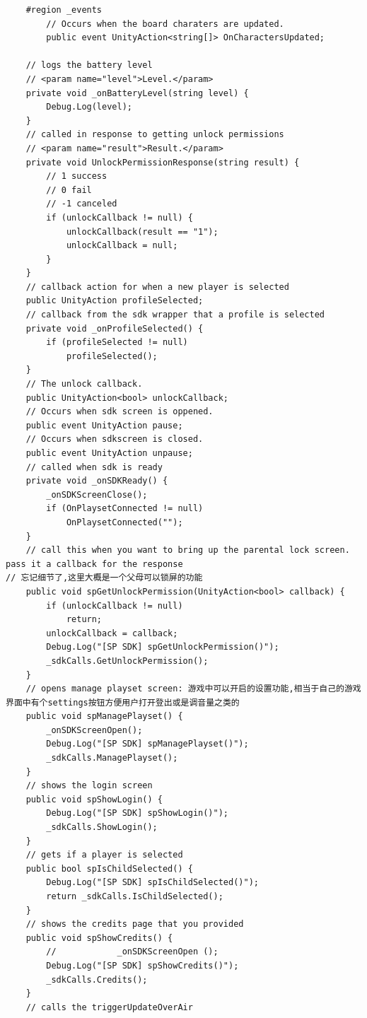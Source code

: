 \documentclass[9pt, b5paper]{article}
\begin{document}
\begin{verbatim}
    #region _events
        // Occurs when the board charaters are updated.
        public event UnityAction<string[]> OnCharactersUpdated;

    // logs the battery level
    // <param name="level">Level.</param>
    private void _onBatteryLevel(string level) {
        Debug.Log(level);
    }
    // called in response to getting unlock permissions
    // <param name="result">Result.</param>
    private void UnlockPermissionResponse(string result) {
        // 1 success
        // 0 fail
        // -1 canceled
        if (unlockCallback != null) {
            unlockCallback(result == "1");
            unlockCallback = null;
        }
    }
    // callback action for when a new player is selected
    public UnityAction profileSelected;
    // callback from the sdk wrapper that a profile is selected
    private void _onProfileSelected() {
        if (profileSelected != null)
            profileSelected();
    }
    // The unlock callback.
    public UnityAction<bool> unlockCallback;
    // Occurs when sdk screen is oppened.
    public event UnityAction pause;
    // Occurs when sdkscreen is closed.
    public event UnityAction unpause;
    // called when sdk is ready
    private void _onSDKReady() {
        _onSDKScreenClose();
        if (OnPlaysetConnected != null)
            OnPlaysetConnected("");
    }
    // call this when you want to bring up the parental lock screen. pass it a callback for the response
// 忘记细节了,这里大概是一个父母可以锁屏的功能      
    public void spGetUnlockPermission(UnityAction<bool> callback) {
        if (unlockCallback != null)
            return;
        unlockCallback = callback;
        Debug.Log("[SP SDK] spGetUnlockPermission()");
        _sdkCalls.GetUnlockPermission();
    }
    // opens manage playset screen: 游戏中可以开启的设置功能,相当于自己的游戏界面中有个settings按钮方便用户打开登出或是调音量之类的
    public void spManagePlayset() {
        _onSDKScreenOpen();
        Debug.Log("[SP SDK] spManagePlayset()");
        _sdkCalls.ManagePlayset();
    }
    // shows the login screen
    public void spShowLogin() {
        Debug.Log("[SP SDK] spShowLogin()");
        _sdkCalls.ShowLogin();
    }
    // gets if a player is selected
    public bool spIsChildSelected() {
        Debug.Log("[SP SDK] spIsChildSelected()");
        return _sdkCalls.IsChildSelected();
    }
    // shows the credits page that you provided
    public void spShowCredits() {
        //            _onSDKScreenOpen ();
        Debug.Log("[SP SDK] spShowCredits()");
        _sdkCalls.Credits();
    }
    // calls the triggerUpdateOverAir

\end{verbatim}
\end{document}
